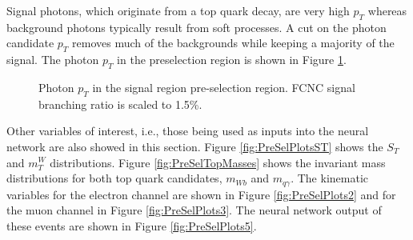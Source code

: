 Signal photons, which originate from a top quark decay, are very high $p_T$ whereas background photons typically result from soft processes.  A cut on the photon candidate $p_T$ removes much of the backgrounds while keeping a majority of the signal.  The photon $p_T$ in the preselection region is shown in Figure \ref{fig:PreSelPlots1}.  
\begin{figure}[h!]
\centering
{}\hfil
{}
\caption{Photon $p_T$ in the signal region pre-selection region.  FCNC signal branching ratio is scaled to 1.5\%.}
\label{fig:PreSelPlots1}
\end{figure}

Other variables of interest, i.e., those being used as inputs into the neural network are also showed in this section.  Figure \ref{fig:PreSelPlotsST} shows the $S_T$ and $m_T^W$ distributions.  Figure \ref{fig:PreSelTopMasses} shows the invariant mass distributions for both top quark candidates, $m_{Wb}$ and $m_{q\gamma}$.  The kinematic variables for the electron channel are shown in Figure \ref{fig:PreSelPlots2} and for the muon channel in Figure \ref{fig:PreSelPlots3}.  The neural network output of these events are shown in Figure \ref{fig:PreSelPlots5}.

